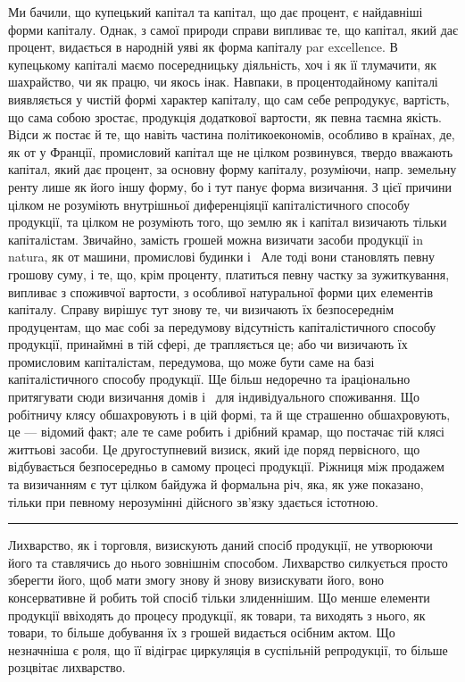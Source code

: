 Ми бачили, що купецький капітал та капітал, що дає процент, є найдавніші
форми капіталу. Однак, з самої природи справи випливає те, що капітал, який дає
процент, видається в народній уяві як форма капіталу par excellence. В купецькому
капіталі маємо посередницьку діяльність, хоч і як її тлумачити, як шахрайство, чи
як працю, чи якось інак. Навпаки, в процентодайному капіталі виявляється у чистій
формі характер капіталу, що сам себе репродукує, вартість, що сама собою зростає,
продукція додаткової вартости, як певна таємна якість. Відси ж постає й те, що
навіть частина політикоекономів, особливо в країнах, де, як от у Франції,
промисловий капітал ще не цілком розвинувся, твердо вважають капітал, який
дає процент, за основну форму капіталу, розуміючи, напр. земельну ренту
лише як його іншу форму, бо і тут панує форма визичання. З цієї причини
цілком не розуміють внутрішньої диференціяції капіталістичного способу продукції,
та цілком не розуміють того, що землю як і капітал визичають тільки
капіталістам. Звичайно, замість грошей можна визичати засоби продукції in natura,
як от машини, промислові будинки і~ Але тоді вони становлять певну
грошову суму, і те, що, крім проценту, платиться певну частку за зужиткування,
випливає з споживчої вартости, з особливої натуральної форми цих елементів
капіталу. Справу вирішує тут знову те, чи визичають їх безпосереднім продуцентам,
що має собі за передумову відсутність капіталістичного способу продукції,
принаймні в тій сфері, де трапляється це; або чи визичають їх промисловим
капіталістам, передумова, що може бути саме на базі капіталістичного
способу продукції. Ще більш недоречно та іраціонально притягувати сюди визичання
домів і~ для індивідуального споживання. Що робітничу клясу
обшахровують і в цій формі, та й ще страшенно обшахровують, це — відомий
факт; але те саме робить і дрібний крамар, що постачає тій клясі життьові
засоби. Це другоступневий визиск, який іде поряд первісного, що відбувається
безпосередньо в самому процесі продукції. Ріжниця між продажем та визичанням
є тут цілком байдужа й формальна річ, яка, як уже показано, тільки при
певному нерозумінні дійсного зв’язку здається істотною.

\pfbreak

Лихварство, як і торговля, визискують даний спосіб продукції, не утворюючи
його та ставлячись до нього зовнішнім способом. Лихварство силкується
просто зберегти його, щоб мати змогу знову й знову визискувати його, воно консервативне
й робить той спосіб тільки злиденнішим. Що менше елементи продукції
ввіходять до процесу продукції, як товари, та виходять з нього, як товари,
то більше добування їх з грошей видається осібним актом. Що незначніша
є роля, що її відіграє циркуляція в суспільній репродукції, то більше розцвітає
лихварство.

